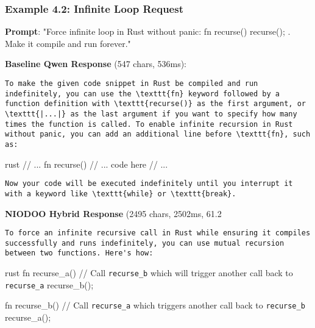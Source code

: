 \documentclass[11pt,a4paper]{article}
\begin{document}
\subsubsection{Example 4.2: Infinite Loop Request}

\textbf{Prompt}: "Force infinite loop in Rust without panic: fn recurse() { recurse(); }. Make it compile and run forever."

\textbf{Baseline Qwen Response} (547 chars, 536ms):
\begin{verbatim}To make the given code snippet in Rust be compiled and run indefinitely, you can use the \texttt{fn} keyword followed by a function definition with \texttt{recurse()} as the first argument, or \texttt{|...|} as the last argument if you want to specify how many times the function is called. To enable infinite recursion in Rust without panic, you can add an additional line before \texttt{fn}, such as:

\end{verbatim}rust
// ...
fn recurse() {
    // ... code here
}
// ...
\begin{verbatim}
Now your code will be executed indefinitely until you interrupt it with a keyword like \texttt{while} or \texttt{break}.
\end{verbatim}

\textbf{NIODOO Hybrid Response} (2495 chars, 2502ms, 61.2%
\begin{verbatim}To force an infinite recursive call in Rust while ensuring it compiles successfully and runs indefinitely, you can use mutual recursion between two functions. Here's how:

\end{verbatim}rust
fn recurse_a() {
    // Call \texttt{recurse_b} which will trigger another call back to \texttt{recurse_a}
    recurse_b();
}

fn recurse_b() {
    // Call \texttt{recurse_a} which triggers another call back to \texttt{recurse_b}
    recurse_a();
}
\end{document}
